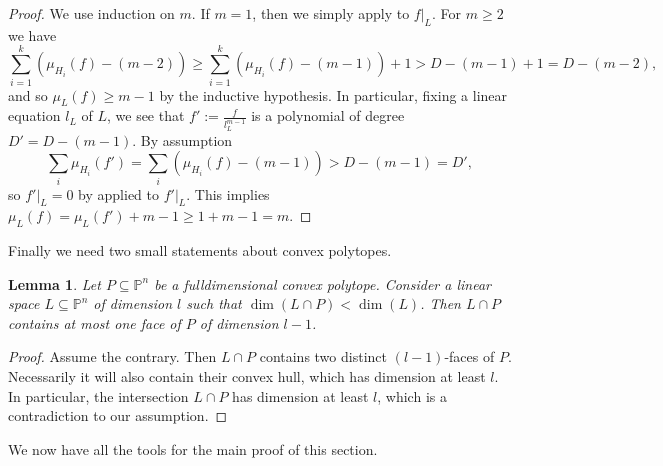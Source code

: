 \documentclass[a4paper,10pt]{amsart}
\theoremstyle{definition}
\theoremstyle{plain}
\newtheorem{lem}[defin]{Lemma}
\newcommand{\pp}{\mathbb{P}}
\begin{document}
\begin{proof}
 We use induction on $m$. If $m = 1$, then we simply apply  to $f|_L$. For $m \geq 2$ we have
 \begin{equation*}
     \sum_{i=1}^k (\mu_{H_i}(f)-(m-2)) \geq \sum_{i=1}^k (\mu_{H_i}(f)-(m-1)) +1 > D - (m - 1) + 1 = D-(m-2),
 \end{equation*}
 and so $\mu_L(f) \geq m-1$ by the inductive hypothesis. In particular, fixing a linear equation $l_L$ of $L$, we see that $f' := \frac{f}{l_L^{m-1}}$ is a polynomial of degree $D'=D-(m-1)$. By assumption
 \begin{equation*}
     \sum_i \mu_{H_i}(f') = \sum_i (\mu_{H_i}(f)-(m-1)) > D - (m - 1)=D',
 \end{equation*}
 so $f'|_L = 0$ by  applied to $f'|_L$. This implies $\mu_L(f)=\mu_L(f')+m-1\geq 1+m-1=m$.
\end{proof}


Finally we need two small statements about convex polytopes.
\begin{lem}
\label{lem: convpol_noninc}
Let $P\subseteq \pp^n$ be a fulldimensional convex polytope.
 Consider a linear space $L \subseteq \pp^n$ of dimension $l$ such that $\dim(L\cap P)< \dim(L)$. Then $L\cap P$ contains at most one face of $P$ of dimension $l-1$.
\end{lem}

\begin{proof}
Assume the contrary. Then $L\cap P$ contains two distinct $(l-1)$-faces of $P$. Necessarily it will also contain their convex hull, which has dimension at least $l$. In particular, the intersection $L \cap P$ has dimension at least $l$, which is a contradiction to our assumption.
\end{proof}


We now have all the tools for the main proof of this section.
\end{document}
